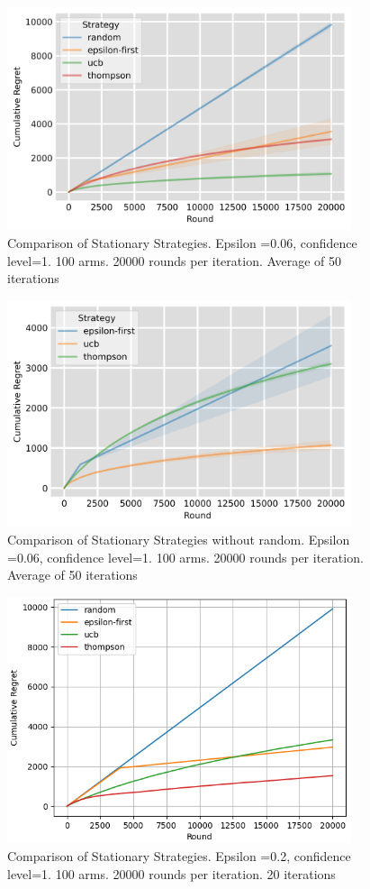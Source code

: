 \begin{figure}[h]
    \centering
    \includegraphics[width=0.9\textwidth]{figures/comparison_of_all_strategies_100_machines}
    \caption[Comparison of Stationary Strategies]{Comparison of Stationary Strategies. Epsilon =0.06, confidence level=1. 100 arms. 20000 rounds per iteration. Average of 50 iterations}
    \label{fig: all1}
\end{figure}

\begin{figure}[h]
    \centering
    \includegraphics[width=0.9\textwidth]{figures/comparison_without_random_100_machines}
    \caption[Comparison of Stationary Strategies without random]{Comparison of Stationary Strategies without random. Epsilon =0.06, confidence level=1. 100 arms. 20000 rounds per iteration. Average of 50 iterations}
    \label{fig: 100 arms without random}
\end{figure}

\begin{figure}[h]
    \centering
    \includegraphics[width=0.9\textwidth]{figures/100machines}
    \caption[Comparison for 100 arms]{Comparison of Stationary Strategies. Epsilon =0.2, confidence level=1. 100 arms. 20000 rounds per iteration. 20 iterations}
    \label{fig: all4}
\end{figure}